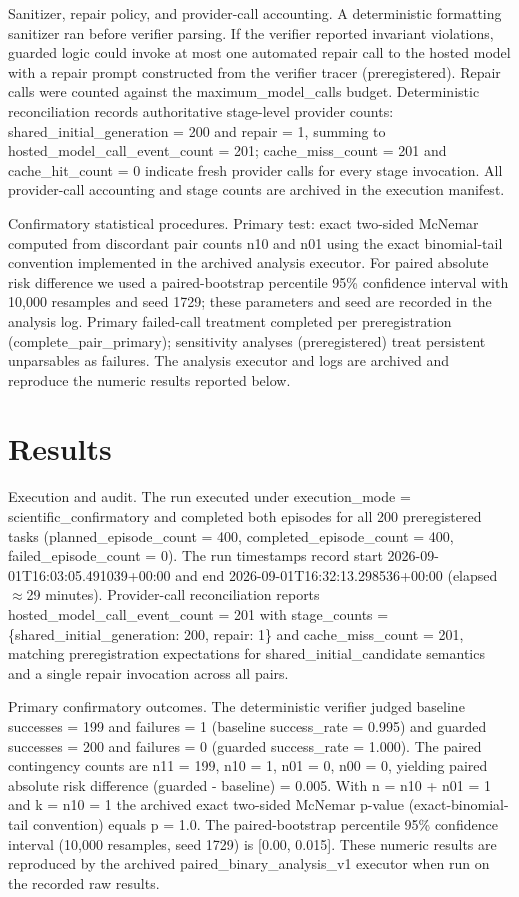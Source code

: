 \documentclass[conference]{IEEEtran}
\begin{document}
Sanitizer, repair policy, and provider-call accounting. A deterministic formatting sanitizer ran before verifier parsing. If the verifier reported invariant violations, guarded logic could invoke at most one automated repair call to the hosted model with a repair prompt constructed from the verifier tracer (preregistered). Repair calls were counted against the maximum\_model\_calls budget. Deterministic reconciliation records authoritative stage-level provider counts: shared\_initial\_generation = 200 and repair = 1, summing to hosted\_model\_call\_event\_count = 201; cache\_miss\_count = 201 and cache\_hit\_count = 0 indicate fresh provider calls for every stage invocation. All provider-call accounting and stage counts are archived in the execution manifest.

Confirmatory statistical procedures. Primary test: exact two-sided McNemar computed from discordant pair counts n10 and n01 using the exact binomial-tail convention implemented in the archived analysis executor. For paired absolute risk difference we used a paired-bootstrap percentile 95\% confidence interval with 10,000 resamples and seed 1729; these parameters and seed are recorded in the analysis log. Primary failed-call treatment completed per preregistration (complete\_pair\_primary); sensitivity analyses (preregistered) treat persistent unparsables as failures. The analysis executor and logs are archived and reproduce the numeric results reported below.

\section{Results}
Execution and audit. The run executed under execution\_mode = scientific\_confirmatory and completed both episodes for all 200 preregistered tasks (planned\_episode\_count = 400, completed\_episode\_count = 400, failed\_episode\_count = 0). The run timestamps record start 2026-09-01T16:03:05.491039+00:00 and end 2026-09-01T16:32:13.298536+00:00 (elapsed \ensuremath{\approx}29 minutes). Provider-call reconciliation reports hosted\_model\_call\_event\_count = 201 with stage\_counts = \{shared\_initial\_generation: 200, repair: 1\} and cache\_miss\_count = 201, matching preregistration expectations for shared\_initial\_candidate semantics and a single repair invocation across all pairs.

Primary confirmatory outcomes. The deterministic verifier judged baseline successes = 199 and failures = 1 (baseline success\_rate = 0.995) and guarded successes = 200 and failures = 0 (guarded success\_rate = 1.000). The paired contingency counts are n11 = 199, n10 = 1, n01 = 0, n00 = 0, yielding paired absolute risk difference (guarded - baseline) = 0.005. With n = n10 + n01 = 1 and k = n10 = 1 the archived exact two-sided McNemar p-value (exact-binomial-tail convention) equals p = 1.0. The paired-bootstrap percentile 95\% confidence interval (10,000 resamples, seed 1729) is [0.00, 0.015]. These numeric results are reproduced by the archived paired\_binary\_analysis\_v1 executor when run on the recorded raw results.
\end{document}
